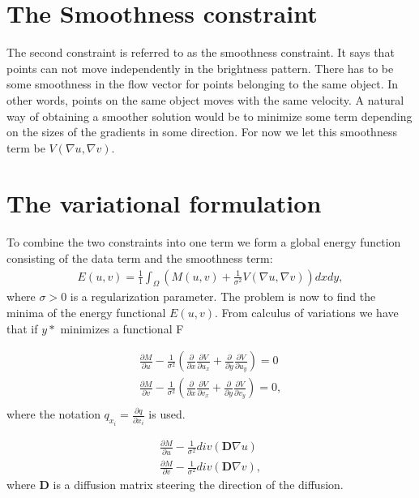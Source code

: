 \documentclass[10pt,a4paper]{article}
\begin{document}
\section{The Smoothness constraint}
The second constraint is referred to as the smoothness constraint. It says that points can not move independently in the brightness pattern. There has to be some smoothness in the flow vector for points belonging to the same object. In other words, points on the same object moves with the same velocity. A natural way of obtaining a smoother solution would be to minimize some term depending on the sizes of the gradients in some direction. For now we let this smoothness term be $V(\nabla u, \nabla v)$.

\section{The variational formulation}
To combine the two constraints into one term we form a global energy function consisting of the data term and the smoothness term:
\begin{align}
E(u,v) = \frac{1}{1} \int_\Omega (M(u,v) + \frac{1}{\sigma^2} V(\nabla u, \nabla v)) dx dy,
\end{align}
where $\sigma > 0$ is a regularization parameter. The problem is now to find the minima of the energy functional $E(u,v)$. From calculus of variations we have that if $y*$ minimizes a functional F

\begin{equation}
\label{EL}
  \begin{aligned}
\frac{\partial M}{\partial u} - \frac{1}{\sigma^2}(\frac{\partial}{\partial x} \frac{\partial V}{\partial u_x} + \frac{\partial}{\partial y} \frac{\partial V}{\partial u_y} ) = 0 \\
\frac{\partial M}{\partial v} - \frac{1}{\sigma^2}(\frac{\partial}{\partial x} \frac{\partial V}{\partial v_x} + \frac{\partial}{\partial y} \frac{\partial V}{\partial v_y} ) = 0, \\
  \end{aligned}
\end{equation}
where the notation $q_{x_i} = \frac{\partial q}{\partial x_i}$ is used. 



\begin{equation}
\label{EL_regu}
  \begin{aligned}
\frac{\partial M}{\partial u} - \frac{1}{\sigma^2} div(\textbf{D} \nabla u) \\
\frac{\partial M}{\partial v} - \frac{1}{\sigma^2} div(\textbf{D} \nabla v),
  \end{aligned}
\end{equation}
where \textbf{D} is a diffusion matrix steering the direction of the diffusion.
\end{document}
